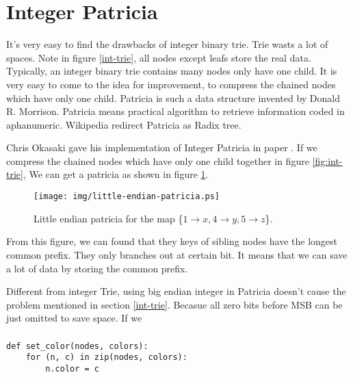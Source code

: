 \documentclass{article}
\begin{document}
\section{Integer Patricia} 
\label{int-patricia}

It's very easy to find the drawbacks of integer binary trie. Trie wasts a lot of 
spaces. Note in figure \ref{int-trie}, all nodes except leafs store the real data.
Typically, an integer binary trie contains many nodes only have one child.
It is very easy to come to the idea for improvement, to compress the chained nodes
which have only one child. Patricia is such a data structure invented by 
Donald R. Morrison. Patricia means practical algorithm to retrieve information coded
in aphanumeric\cite{patricia-morrison}. Wikipedia redirect Patricia as Radix tree.

Chris Okasaki gave his implementation of Integer Patricia in paper \cite{okasaki-int-map}. 
If we compress the chained nodes which have only one child together in figure \ref{fig:int-trie},
We can get a patricia as shown in figure \ref{fig:little-endian-patricia}.

\begin{figure}[htbp]
       \begin{center}
	\texttt{[image: img/little-endian-patricia.ps]}
        \caption{Little endian patricia for the map 
                        \{$ 1 \rightarrow x, 4 \rightarrow y, 5 \rightarrow z$\}.} 
        \label{fig:little-endian-patricia}
       \end{center}
\end{figure}

From this figure, we can found that they keys of sibling nodes have the longest common prefix.
They only branches out at certain bit. It means that we can save a lot of data by storing the common
prefix. 

Different from integer Trie, using big endian integer in Patricia doesn't cause the problem mentioned
in section \ref{int-trie}. Becasue all zero bits before MSB can be just omitted to save space. If
we 

\subsubsection*{}
\lstset{language=Python}
\begin{lstlisting}
def set_color(nodes, colors):
    for (n, c) in zip(nodes, colors):
        n.color = c
\end{lstlisting}
\end{document}
